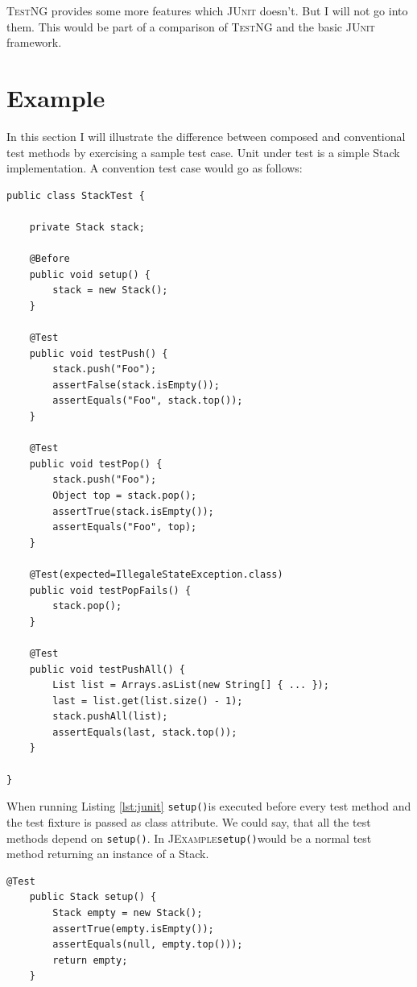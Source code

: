 \documentclass[11pt,a4paper,pdftex]{article}
\newcommand{\JUnit}{\textsc{JUnit}\xspace}
\newcommand{\JExample}{\textsc{JExample}\xspace}
\newcommand{\TestNG}{\textsc{TestNG}\xspace}
\newcommand{\ttt}[1]{\texttt{#1}}
\newcommand{\setup}{\ttt{setup()}}
\begin{document}
\TestNG provides some more features which \JUnit doesn't. But I will not go into them. This would be part of a comparison of \TestNG and the basic \JUnit framework.

\section{Example}

In this section I will illustrate the difference between composed and conventional test methods by exercising a sample test case. Unit under test is a simple Stack implementation. A convention test case would go as follows:

\begin{lstlisting}[label=lst:junit,caption=Conventional \JUnit test case.]
public class StackTest {

    private Stack stack;

    @Before
    public void setup() {
        stack = new Stack();
    }

    @Test
    public void testPush() {
        stack.push("Foo");
        assertFalse(stack.isEmpty());
        assertEquals("Foo", stack.top());
    }

    @Test
    public void testPop() {
        stack.push("Foo");
        Object top = stack.pop();
        assertTrue(stack.isEmpty());
        assertEquals("Foo", top);
    }

    @Test(expected=IllegaleStateException.class)
    public void testPopFails() {
        stack.pop();
    }

    @Test
    public void testPushAll() {
        List list = Arrays.asList(new String[] { ... });
        last = list.get(list.size() - 1);
        stack.pushAll(list);
        assertEquals(last, stack.top());
    }

}
\end{lstlisting}

When running Listing \ref{lst:junit} \setup is executed before every test method and the test fixture is passed as class attribute. We could say, that all the test methods depend on \setup. In \JExample \setup would be a normal test method returning an instance of a Stack.

\begin{lstlisting}[label=lst:setup,caption=Promote fixture to test with return value.]
    @Test
    public Stack setup() {
        Stack empty = new Stack();
        assertTrue(empty.isEmpty());
        assertEquals(null, empty.top()));
        return empty;
    }
\end{lstlisting}
\end{document}
